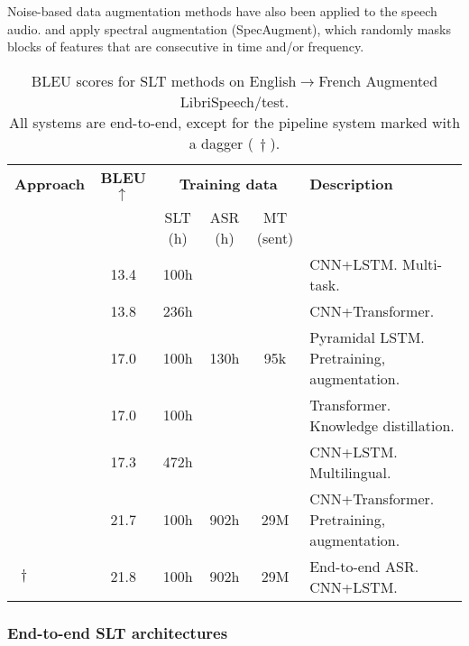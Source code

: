\documentclass{svjour3}
\newcommand{\lp}[2]{#1$\rightarrow$#2}
\newcommand{\uua}[0]{$\uparrow\,$}
\newcommand{\dg}[0] {$\,\dagger$}
\begin{document}
Noise-based data augmentation methods have also been applied to the speech audio.
\citet{bahar2019usingSpecAugment} and \citet{digangi2019data} apply spectral augmentation (SpecAugment),
which randomly masks blocks of features that are consecutive in time and/or frequency.

\begin{table}[t]
\centering
\caption{BLEU scores for SLT methods on \lp{English}{French} Augmented LibriSpeech/test.\\
All systems are end-to-end,
except for the pipeline system marked with a dagger (\dg).
\label{tbl:slt:librispeech}}
\renewcommand{\arraystretch}{1.1}
\begin{tabular}{@{}lccccl@{}}
\toprule
\textbf{Approach}                  & \textbf{BLEU \uua} & \multicolumn{3}{c}{\textbf{Training data}} & \textbf{Description} \\ 
\cmidrule(lr){3-5}
                                   &                    & SLT (h) & ASR (h) & MT (sent) & \\
\midrule
\citet{berard-e2e-audiobooks-2018} & 13.4               & 100h    &         &           & CNN+LSTM. Multi-task. \\
\citet{di2019adapting}             & 13.8               & 236h    &         &           & CNN+Transformer. \\
\citet{bahar2019usingSpecAugment}  & 17.0               & 100h    & 130h    & 95k       & Pyramidal LSTM. Pretraining, augmentation. \\
\citet{liu2019end}                 & 17.0               & 100h    &         &           & Transformer. Knowledge distillation. \\
\citet{inaguma2019multilingual}    & 17.3               & 472h    &         &           & CNN+LSTM. Multilingual. \\
\citet{pino2019harnessing}         & 21.7               & 100h    & 902h    & 29M       & CNN+Transformer. Pretraining, augmentation. \\
\citet{pino2019harnessing}\dg      & 21.8               & 100h    & 902h    & 29M       & End-to-end ASR. CNN+LSTM. \\
\bottomrule
\end{tabular}
\end{table}

\subsubsection{End-to-end SLT architectures}
\end{document}
